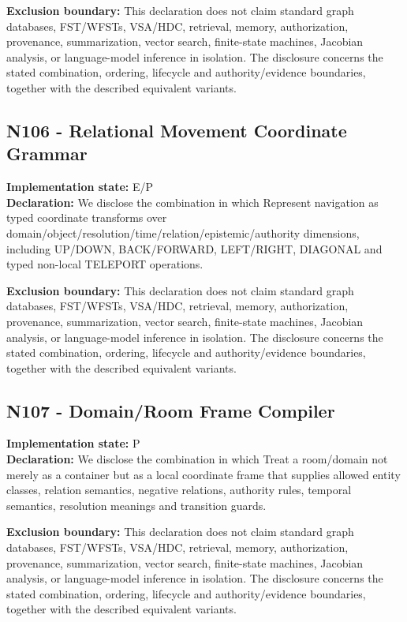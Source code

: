 \documentclass[
  10pt,
  letterpaper,
]{article}
\begin{document}
\textbf{Exclusion boundary:} This declaration does not claim standard
graph databases, FST/WFSTs, VSA/HDC, retrieval, memory, authorization,
provenance, summarization, vector search, finite-state machines,
Jacobian analysis, or language-model inference in isolation. The
disclosure concerns the stated combination, ordering, lifecycle and
authority/evidence boundaries, together with the described equivalent
variants.

\subsection{N106 - Relational Movement Coordinate
Grammar}\label{n106---relational-movement-coordinate-grammar}

\textbf{Implementation state:} E/P\\
\textbf{Declaration:} We disclose the combination in which Represent
navigation as typed coordinate transforms over
domain/object/resolution/time/relation/epistemic/authority dimensions,
including UP/DOWN, BACK/FORWARD, LEFT/RIGHT, DIAGONAL and typed
non-local TELEPORT operations.

\textbf{Exclusion boundary:} This declaration does not claim standard
graph databases, FST/WFSTs, VSA/HDC, retrieval, memory, authorization,
provenance, summarization, vector search, finite-state machines,
Jacobian analysis, or language-model inference in isolation. The
disclosure concerns the stated combination, ordering, lifecycle and
authority/evidence boundaries, together with the described equivalent
variants.

\subsection{N107 - Domain/Room Frame
Compiler}\label{n107---domainroom-frame-compiler}

\textbf{Implementation state:} P\\
\textbf{Declaration:} We disclose the combination in which Treat a
room/domain not merely as a container but as a local coordinate frame
that supplies allowed entity classes, relation semantics, negative
relations, authority rules, temporal semantics, resolution meanings and
transition guards.

\textbf{Exclusion boundary:} This declaration does not claim standard
graph databases, FST/WFSTs, VSA/HDC, retrieval, memory, authorization,
provenance, summarization, vector search, finite-state machines,
Jacobian analysis, or language-model inference in isolation. The
disclosure concerns the stated combination, ordering, lifecycle and
authority/evidence boundaries, together with the described equivalent
variants.
\end{document}
